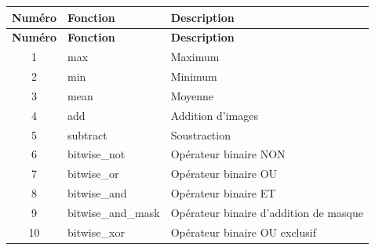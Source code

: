 \documentclass[a4paper,12pt]{report}
\begin{document}
\begin{longtable}{|c|l|P{6cm}|}
    \hline
    \textbf{Numéro} & \textbf{Fonction}                & \textbf{Description}                                                                           \\
    \hline
    \endfirsthead

    \hline
    \textbf{Numéro} & \textbf{Fonction}                & \textbf{Description}                                                                           \\
    \hline
    \endhead

    \hline
    \endfoot

    \hline
    \endlastfoot


    1               & max                              & Maximum                                                                                        \\
    2               & min                              & Minimum                                                                                        \\
    3               & mean                             & Moyenne                                                                                        \\
    4               & add                              & Addition d'images                                                                              \\
    5               & subtract                         & Soustraction                                                                                   \\
    6               & bitwise\_not                     & Opérateur binaire NON                                                                          \\
    7               & bitwise\_or                      & Opérateur binaire OU                                                                           \\
    8               & bitwise\_and                     & Opérateur binaire ET                                                                           \\
    9               & bitwise\_and\_mask               & Opérateur binaire d'addition de masque                                                         \\
    10              & bitwise\_xor                     & Opérateur binaire OU exclusif                                                                  \\

\end{longtable}
\end{document}

